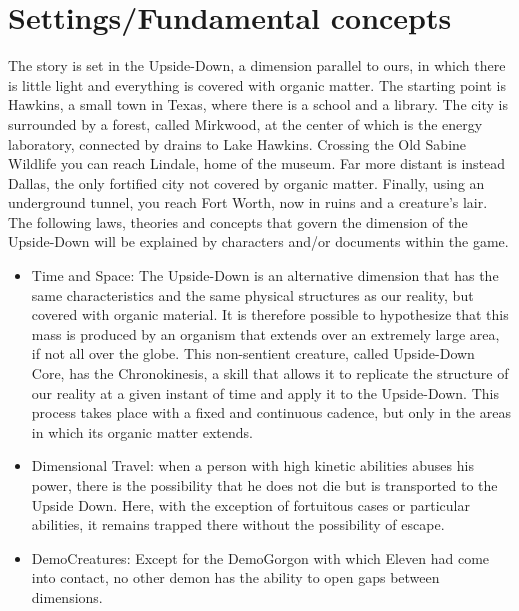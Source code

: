 \section{Settings/Fundamental concepts}
The story is set in the Upside-Down, a dimension parallel to ours, in which there is little light and everything is covered with organic matter.
The starting point is Hawkins, a small town in Texas, where there is a school and a library. The city is surrounded by a forest, called Mirkwood, at the center of which is the energy laboratory, connected by drains to Lake Hawkins. Crossing the Old Sabine Wildlife you can reach Lindale, home of the museum. Far more distant is instead Dallas, the only fortified city not covered by organic matter. Finally, using an underground tunnel, you reach Fort Worth, now in ruins and a creature's lair.\\
The following laws, theories and concepts that govern the dimension of the Upside-Down will be explained by characters and/or documents within the game.

\begin{itemize}
	\item Time and Space: The Upside-Down is an alternative dimension that has the same characteristics and the same physical structures as our reality, but covered with organic material. It is therefore possible to hypothesize that this mass is produced by an organism that extends over an extremely large area, if not all over the globe. This non-sentient creature, called Upside-Down Core, has the Chronokinesis, a skill that allows it to replicate the structure of our reality at a given instant of time and apply it to the Upside-Down. This process takes place with a fixed and 
	continuous cadence, but only in the areas in which its organic matter extends.
	\item Dimensional Travel: when a person with high kinetic abilities abuses his power, there is the possibility that he does not die but is transported to the Upside Down. Here, with the exception of fortuitous cases or particular abilities, it remains trapped there without the possibility of escape.
	\item DemoCreatures: Except for the DemoGorgon with which Eleven had come into contact, no other demon has the ability to open gaps between dimensions.
\end{itemize}

